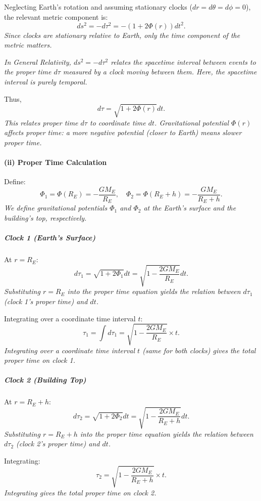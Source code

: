     Neglecting Earth's rotation and assuming stationary clocks ($dr = d\theta = d\phi = 0$), the relevant metric component is:
    \[
        ds^2 = -d\tau^2 = -\left(1 + 2\Phi(r)\right)dt^2.
    \]
    \textit{Since clocks are stationary relative to Earth, only the time component of the metric matters.}

    \textit{In General Relativity, $ds^2 = -d\tau^2$ relates the spacetime interval between events to the proper time $d\tau$ measured by a clock moving between them. Here, the spacetime interval is purely temporal.}

    Thus,
    \[
        d\tau = \sqrt{1 + 2\Phi(r)} dt.
    \]
    \textit{This relates proper time $d\tau$ to coordinate time $dt$. Gravitational potential $\Phi(r)$ affects proper time: a more negative potential (closer to Earth) means slower proper time.}

    \paragraph{(ii) Proper Time Calculation}

    Define:
    \[
        \Phi_1 = \Phi(R_E) = -\frac{GM_E}{R_E}, \quad \Phi_2 = \Phi(R_E + h) = -\frac{GM_E}{R_E + h}.
    \]
    \textit{We define gravitational potentials $\Phi_1$ and $\Phi_2$ at the Earth's surface and the building's top, respectively.}

    \subparagraph{Clock 1 (Earth's Surface)}

    At $r = R_E$:
    \[
        d\tau_1 = \sqrt{1 + 2\Phi_1} dt = \sqrt{1 - \frac{2GM_E}{R_E}} dt.
    \]
    \textit{Substituting $r = R_E$ into the proper time equation yields the relation between $d\tau_1$ (clock 1's proper time) and $dt$.}

    Integrating over a coordinate time interval $t$:
    \[
        \tau_1 = \int d\tau_1 = \sqrt{1 - \frac{2GM_E}{R_E}} \times t.
    \]
    \textit{Integrating over a coordinate time interval $t$ (same for both clocks) gives the total proper time on clock 1.}

    \subparagraph{Clock 2 (Building Top)}

    At $r = R_E + h$:
    \[
        d\tau_2 = \sqrt{1 + 2\Phi_2} dt = \sqrt{1 - \frac{2GM_E}{R_E + h}} dt.
    \]
    \textit{Substituting $r = R_E + h$ into the proper time equation yields the relation between $d\tau_2$ (clock 2's proper time) and $dt$.}

    Integrating:
    \[
        \tau_2 = \sqrt{1 - \frac{2GM_E}{R_E + h}} \times t.
    \]
    \textit{Integrating gives the total proper time on clock 2.}

